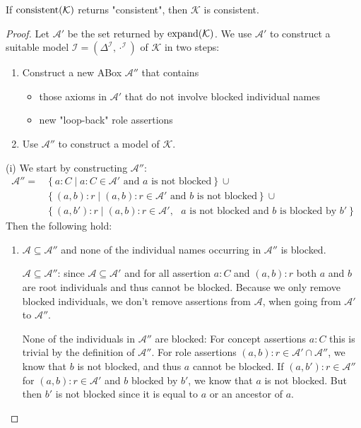 \begin{lemma}[Soundness]
	If $\operatorname{\text{consistent}}(\mathcal{K})$ returns "consistent", then $\mathcal{K}$ is consistent.
\end{lemma}
\begin{proof}
	Let $\mathcal{A}'$ be the set returned by $\operatorname{\text{expand}}(\mathcal{K})$.
	We use $\mathcal{A}'$ to construct a suitable model $\mathcal{I} = (\Delta^\mathcal{I}, \cdot^\mathcal{I})$
	of $\mathcal{K}$ in two steps:
	\begin{enumerate}[label=(\roman*)]
		\item Construct a new ABox $\mathcal{A}''$ that contains
			\begin{itemize}
				\item those axioms in $\mathcal{A}'$ that do not involve blocked individual names
				\item new "loop-back" role assertions
			\end{itemize}
		\item Use $\mathcal{A}''$ to construct a model of $\mathcal{K}$.
	\end{enumerate}
	(i) We start by constructing $\mathcal{A}''$:
	\begin{align*}
		\mathcal{A}'' = &\left\{ a:C \mid a:C \in \mathcal{A}' \text{ and $a$ is not blocked} \right\} \cup \\
						&\left\{ (a,b):r \mid (a,b):r \in \mathcal{A}' \text{ and $b$ is not blocked} \right\} \cup \\
						&\left\{ (a,b'):r \mid (a,b):r \in \mathcal{A}', \text{ $a$ is not blocked and $b$ is blocked by  $b'$} \right\}
	\end{align*}
	Then the following hold:
	\begin{enumerate}
		\item $\mathcal{A} \subseteq \mathcal{A}''$ and none of the individual names occurring in $\mathcal{A}''$ is blocked.
			\begin{subproof}
				$\mathcal{A} \subseteq \mathcal{A}''$: since $\mathcal{A} \subseteq \mathcal{A}'$ and for all assertion
				$a:C$ and  $(a,b):r$ both $a$ and $b$ are root individuals
				and thus cannot be blocked.
				Because we only remove blocked individuals, we don't remove assertions from $\mathcal{A}$,
				when going from $\mathcal{A}'$ to $\mathcal{A}''$.

				None of the individuals in $\mathcal{A}''$ are blocked:
				For concept assertions $a:C$ this is trivial by the definition of $\mathcal{A}''$.
				For role assertions $(a,b):r \in \mathcal{A}' \cap \mathcal{A}''$, we know that $b$ is not blocked,
				and thus $a$ cannot be blocked.
				If $(a,b'):r \in \mathcal{A}''$ for $(a,b):r \in \mathcal{A}'$ and $b$ blocked by $b'$,
				we know that $a$ is not blocked.
				But then $b'$ is not blocked since it is equal to $a$ or an ancestor of $a$.
			\end{subproof}


\end{enumerate}
\end{proof}
